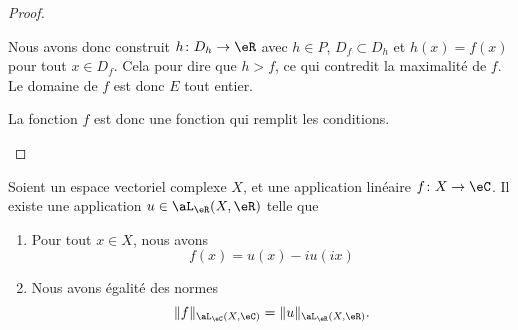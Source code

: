 \begin{proof}
\begin{subproof}
		Nous avons donc construit \( h\colon D_h\to \eR\) avec \( h\in P\), \( D_f\subset D_h\) et \( h(x)=f(x)\) pour tout \( x\in D_f\). Cela pour dire que \( h>f\), ce qui contredit la maximalité de \( f\). Le domaine de \( f\) est donc \( E\) tout entier.

		La fonction \( f\) est donc une fonction qui remplit les conditions.

	\end{subproof}
\end{proof}


\begin{lemma}
	Soient un espace vectoriel complexe \( X\), et une application linéaire \(f \colon X\to \eC  \). Il existe une application \( u\in \aL_\eR(X,\eR)\) telle que
	\begin{enumerate}
		\item		\label{ITEMooBWQUooRbPZSn}
		      Pour tout \( x\in X\), nous avons
		      \begin{equation}
			      f(x)=u(x)-iu(ix)
		      \end{equation}
		\item		\label{ITEMooFIZBooDnYKSO}
		      Nous avons égalité des normes
		      \begin{equation}
			      \| f \|_{\aL_\eC(X,\eC)}=\| u \|_{\aL_\eR(X,\eR)}.
		      \end{equation}
	\end{enumerate}
\end{lemma}

